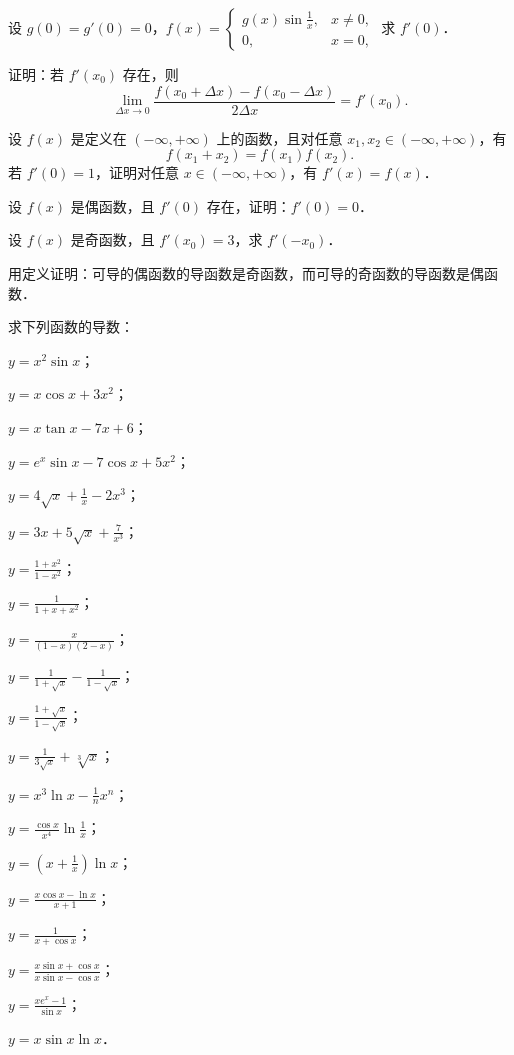 \begin{xiti}
\item 设 $g(0) = g'(0) = 0$，$f(x) = \begin{cases} g(x)\sin\frac{1}{x}, & x \neq 0, \\ 0, & x = 0, \end{cases}$ 求 $f'(0)$．

\item 证明：若 $f'(x_0)$ 存在，则
\[
\lim_{\Delta x \to 0} \frac{f(x_0 + \Delta x) - f(x_0 - \Delta x)}{2\Delta x} = f'(x_0).
\]

\item 设 $f(x)$ 是定义在 $(-\infty, +\infty)$ 上的函数，且对任意 $x_1, x_2 \in (-\infty, +\infty)$，有
\[
f(x_1 + x_2) = f(x_1)f(x_2).
\]
若 $f'(0) = 1$，证明对任意 $x \in (-\infty, +\infty)$，有 $f'(x) = f(x)$．

\item 设 $f(x)$ 是偶函数，且 $f'(0)$ 存在，证明：$f'(0) = 0$．

\item 设 $f(x)$ 是奇函数，且 $f'(x_0) = 3$，求 $f'(-x_0)$．

\item 用定义证明：可导的偶函数的导函数是奇函数，而可导的奇函数的导函数是偶函数．

\item 求下列函数的导数：
\begin{ziti}
\item $y = x^2 \sin x$；
\item $y = x \cos x + 3x^2$；
\item $y = x \tan x - 7x + 6$；
\item $y = e^x \sin x - 7\cos x + 5x^2$；
\item $y = 4\sqrt{x} + \frac{1}{x} - 2x^3$；
\item $y = 3x + 5\sqrt{x} + \frac{7}{x^3}$；
\item $y = \frac{1 + x^2}{1 - x^2}$；
\item $y = \frac{1}{1 + x + x^2}$；
\item $y = \frac{x}{(1-x)(2-x)}$；
\item $y = \frac{1}{1 + \sqrt{x}} - \frac{1}{1 - \sqrt{x}}$；
\item $y = \frac{1 + \sqrt{x}}{1 - \sqrt{x}}$；
\item $y = \frac{1}{3\sqrt{x}} + \sqrt[3]{x}$；
\item $y = x^3 \ln x - \frac{1}{n}x^n$；
\item $y = \frac{\cos x}{x^4}\ln\frac{1}{x}$；
\item $y = \left(x + \frac{1}{x}\right)\ln x$；
\item $y = \frac{x\cos x - \ln x}{x + 1}$；
\item $y = \frac{1}{x + \cos x}$；
\item $y = \frac{x\sin x + \cos x}{x\sin x - \cos x}$；
\item $y = \frac{xe^x - 1}{\sin x}$；
\item $y = x\sin x \ln x$．
\end{ziti}


\end{xiti}

